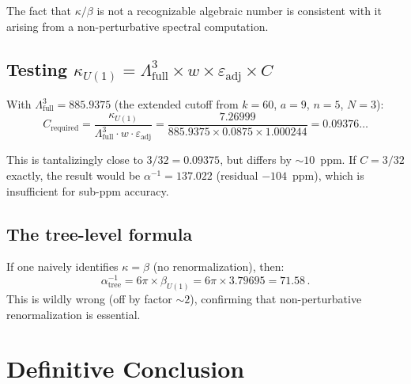 \documentclass[12pt,a4paper]{article}
\theoremstyle{definition}
\begin{document}
The fact that $\kappa/\beta$ is not a recognizable algebraic number
is consistent with it arising from a non-perturbative spectral computation.

\subsection{Testing $\kappa_{U(1)} = \Lambda^3_{\mathrm{full}} \times w \times \varepsilon_{\mathrm{adj}} \times C$}

With $\Lambda^3_{\mathrm{full}} = 885.9375$ (the extended cutoff from
$k = 60$, $a = 9$, $n = 5$, $N = 3$):
\begin{equation}
C_{\mathrm{required}} = \frac{\kappa_{U(1)}}{\Lambda^3_{\mathrm{full}} \cdot w \cdot \varepsilon_{\mathrm{adj}}}
= \frac{7.26999}{885.9375 \times 0.0875 \times 1.000244}
= 0.09376\ldots
\end{equation}

This is tantalizingly close to $3/32 = 0.09375$, but differs by $\sim 10$~ppm.
If $C = 3/32$ exactly, the result would be $\alpha^{-1} = 137.022$
(residual $-104$~ppm), which is insufficient for sub-ppm accuracy.

\subsection{The tree-level formula}

If one naively identifies $\kappa = \beta$ (no renormalization), then:
\begin{equation}
\alpha^{-1}_{\mathrm{tree}} = 6\pi \times \beta_{U(1)}
= 6\pi \times 3.79695 = 71.58\,.
\end{equation}
This is wildly wrong (off by factor $\sim 2$), confirming that
non-perturbative renormalization is essential.

\section{Definitive Conclusion}
\label{sec:conclusion}
\end{document}
